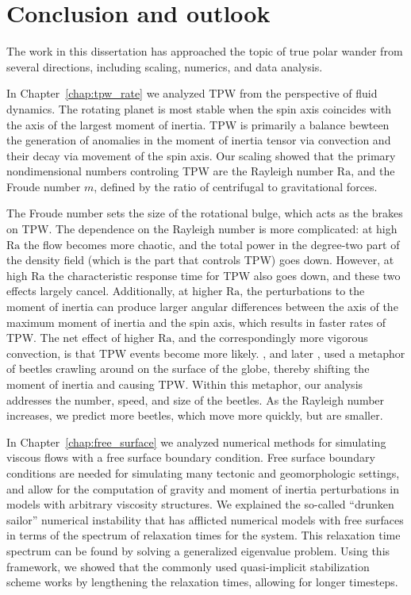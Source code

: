 \chapter{Conclusion and outlook}
\label{chap:conclusion}

The work in this dissertation has approached the topic of true polar wander
from several directions, including scaling, numerics, and data analysis.

In Chapter~\ref{chap:tpw_rate} we analyzed TPW from the perspective of fluid dynamics.
The rotating planet is most stable when the spin axis coincides with the axis of the largest moment of inertia.
TPW is primarily a balance bewteen the generation of anomalies in the moment of inertia tensor
via convection and their decay via movement of the spin axis.
Our scaling showed that the primary nondimensional numbers controling TPW are the Rayleigh number $\mathrm{Ra}$,
and the Froude number $m$, defined by the ratio of centrifugal to gravitational forces.

The Froude number sets the size of the rotational bulge, which acts
as the brakes on TPW. The dependence on the Rayleigh number is more complicated:
at high $\mathrm{Ra}$ the flow becomes more chaotic, and the total power in the degree-two
part of the density field (which is the part that controls TPW) goes down.
However, at high $\mathrm{Ra}$ the characteristic response time for TPW also goes down,
and these two effects largely cancel. Additionally, at higher $\mathrm{Ra}$,
the perturbations to the moment of inertia can produce larger angular differences
between the axis of the maximum moment of inertia and the spin axis,
which results in faster rates of TPW. The net effect of higher $\mathrm{Ra}$,
and the correspondingly more vigorous convection, is that TPW events become more likely.
\citet{gold1955instability}, and later \citet{goldreich1969some}, used a metaphor
of beetles crawling around on the surface of the globe, thereby shifting the moment
of inertia and causing TPW. Within this metaphor, our analysis addresses the
number, speed, and size of the beetles. As the Rayleigh number increases,
we predict more beetles, which move more quickly, but are smaller.

In Chapter~\ref{chap:free_surface} we analyzed numerical methods for simulating
viscous flows with a free surface boundary condition. Free surface boundary conditions
are needed for simulating many tectonic and geomorphologic settings, and
allow for the computation of gravity and moment of inertia perturbations 
in models with arbitrary viscosity structures. 
We explained the so-called ``drunken sailor'' numerical instability that
has afflicted numerical models with free surfaces in terms of the spectrum of relaxation
times for the system. This relaxation time spectrum can be found by solving a generalized eigenvalue problem.
Using this framework, we showed that the commonly used quasi-implicit stabilization
scheme works by lengthening the relaxation times, allowing for longer timesteps.

